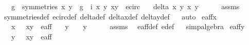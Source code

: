 \begin{isabellebody}
\ \ \ {\isachardoublequoteopen}g\ {\isasymin}\ symmetries{\isachardoublequoteclose}\ {\isachardoublequoteopen}{\isacharparenleft}x{\isacharprime}{\isacharcomma}\ y{\isacharprime}{\isacharparenright}\ {\isacharequal}\ {\isacharparenleft}g\ {\isasymcirc}\ i{\isacharparenright}\ {\isacharparenleft}x{\isacharcomma}\ y{\isacharparenright}{\isachardoublequoteclose}\ {\isachardoublequoteopen}{\isacharparenleft}x{\isacharcomma}y{\isacharparenright}\ {\isasymin}\ e{\isacharunderscore}circ{\isachardoublequoteclose}\isanewline
\ \ \ {\isachardoublequoteopen}delta{\isacharprime}\ x\ y\ x{\isacharprime}\ y{\isacharprime}\ {\isacharequal}\ {}{\isachardoublequoteclose}\isanewline
%
\isadelimproof
\ \ %
\endisadelimproof
%
\isatagproof
{}\isamarkupfalse%
\ assms\ \isamarkupfalse%
\ symmetries{\isacharunderscore}def\ e{\isacharunderscore}circ{\isacharunderscore}def\ delta{\isacharprime}{\isacharunderscore}def\ delta{\isacharunderscore}x{\isacharunderscore}def\ delta{\isacharunderscore}y{\isacharunderscore}def\isanewline
\ \ \isamarkupfalse%
{\isacharparenleft}auto{\isacharparenright}%
\endisatagproof
{\isafoldproof}%
%
\isadelimproof
\isanewline
%
\endisadelimproof
\isanewline
\isanewline
{}\isamarkupfalse%
\ e{\isacharunderscore}aff{\isacharunderscore}x{}{\isacharcolon}\isanewline
\ \ \ {\isachardoublequoteopen}x\ {\isacharequal}\ {}{\isachardoublequoteclose}\ {\isachardoublequoteopen}{\isacharparenleft}x{\isacharcomma}y{\isacharparenright}\ {\isasymin}\ e{\isacharunderscore}aff{\isachardoublequoteclose}\isanewline
\ \ \ {\isachardoublequoteopen}y\ {\isacharequal}\ {}\ {\isasymor}\ y\ {\isacharequal}\ {\isacharminus}{}{\isachardoublequoteclose}\isanewline
%
\isadelimproof
\ \ %
\endisadelimproof
%
\isatagproof
{}\isamarkupfalse%
\ assms\ \isamarkupfalse%
\ e{\isacharunderscore}aff{\isacharunderscore}def\ e{\isacharprime}{\isacharunderscore}def\isanewline
\ \ \isamarkupfalse%
{\isacharparenleft}simp{\isacharcomma}algebra{\isacharparenright}%
\endisatagproof
{\isafoldproof}%
%
\isadelimproof
\isanewline
%
\endisadelimproof
\isanewline
{}\isamarkupfalse%
\ e{\isacharunderscore}aff{\isacharunderscore}y{}{\isacharcolon}\isanewline
\ \ \ {\isachardoublequoteopen}y\ {\isacharequal}\ {}{\isachardoublequoteclose}\ {\isachardoublequoteopen}{\isacharparenleft}x{\isacharcomma}y{\isacharparenright}\ {\isasymin}\ e{\isacharunderscore}aff{\isachardoublequoteclose}\isanewline

\end{isabellebody}
